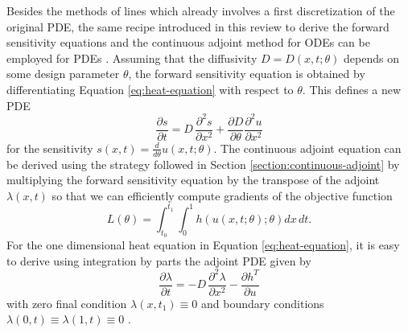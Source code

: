 Besides the methods of lines which already involves a first discretization of the original PDE, the same recipe introduced in this review to derive the forward sensitivity equations and the continuous adjoint method for ODEs can be employed for PDEs \cite{Giles_Pierce_2000}. 
Assuming that the diffusivity $D = D(x, t; \theta)$ depends on some design parameter $\theta$, the forward sensitivity equation is obtained by differentiating Equation \eqref{eq:heat-equation} with respect to $\theta$. 
This defines a new PDE
\begin{equation}
 \frac{\partial s}{\partial t}
 = 
 D \, 
 \frac{\partial^2 s}{\partial x^2}
 + 
 \frac{\partial D}{\partial \theta} \frac{\partial^2 u}{\partial x^2}
\end{equation}
for the sensitivity $s(x,t) = \frac{d}{d\theta}u(x,t;\theta)$. 
The continuous adjoint equation can be derived using the strategy followed in Section \ref{section:continuous-adjoint} by multiplying the forward sensitivity equation by the transpose of the adjoint $\lambda (x,t)$ so that we can efficiently compute gradients of the objective function
\begin{equation}
    L(\theta) = \int_{t_0}^{t_1} \int_0^1 h(u(x,t;\theta); \theta) dx \, dt. 
\end{equation}
For the one dimensional heat equation in Equation \eqref{eq:heat-equation}, it is easy to derive using integration by parts the adjoint PDE given by 
\begin{equation}
    \frac{\partial \lambda}{\partial t}
    = 
    - 
    D \, \frac{\partial^2 \lambda}{\partial x^2}
    - 
    \frac{\partial h^T}{\partial u}
\end{equation}
with zero final condition $\lambda(x, t_1) \equiv 0$ and boundary conditions $\lambda(0, t) \equiv \lambda(1, t) \equiv 0$ \cite{duchateau1996introduction}.

